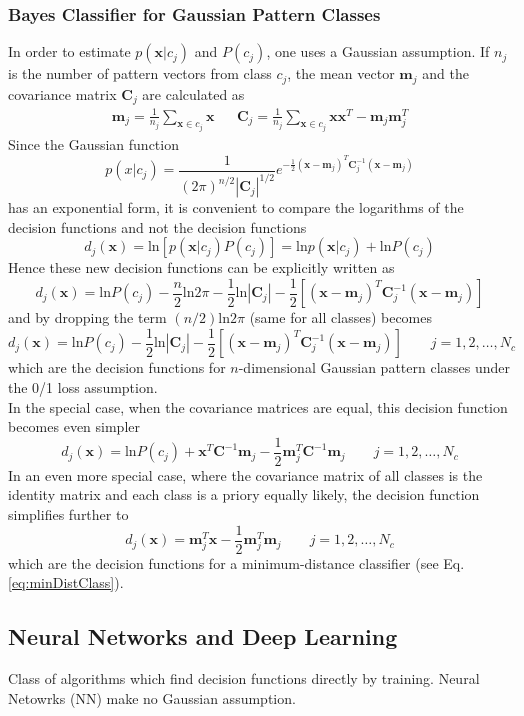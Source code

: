 \subsubsection{Bayes Classifier for Gaussian Pattern Classes}
In order to estimate $p(\mathbf{x}|c_j)$ and $P(c_j)$, one uses a Gaussian assumption.
If $n_j$ is the number of pattern vectors from class $c_j$, the mean vector $\mathbf{m}_j$ and the covariance matrix $\mathbf{C}_j$ are calculated as
\begin{align*}
	\mathbf{m}_j = \frac{1}{n_j} \sum\limits_{\mathbf{x}\in c_j} \mathbf{x}
	&&
	\mathbf{C}_j = \frac{1}{n_j} \sum\limits_{\mathbf{x}\in c_j} \mathbf{x}\mathbf{x}^T - \mathbf{m}_j\mathbf{m}_j^T
\end{align*}
Since the Gaussian function
\[
  p(x|c_j) = \frac{1}{(2\pi)^{n/2} |\mathbf{C}_j|^{1/2}} e^{-\frac{1}{2}(\mathbf{x} - \mathbf{m}_j)^T \mathbf{C}_j^{-1} (\mathbf{x} - \mathbf{m}_j)}
\]
has an exponential form, it is convenient to compare the logarithms of the decision functions and not the decision functions
\[
  d_j(\mathbf{x}) = \text{ln}[p(\mathbf{x}|c_j) P(c_j)] = \text{ln}p(\mathbf{x}|c_j) + \text{ln}P(c_j)
\]
Hence these new decision functions can be explicitly written as
\[
  d_j(\mathbf{x}) = \text{ln}P(c_j) - \frac{n}{2}\text{ln}2\pi - \frac{1}{2}\text{ln}|\mathbf{C}_j| - \frac{1}{2}[(\mathbf{x} - \mathbf{m}_j)^T \mathbf{C}_j^{-1} (\mathbf{x} - \mathbf{m}_j)]
\]
and by dropping the term $(n/2)\text{ln}2\pi$ (same for all classes) becomes
\[
  d_j(\mathbf{x}) = \text{ln}P(c_j) - \frac{1}{2}\text{ln}|\mathbf{C}_j| - \frac{1}{2}[(\mathbf{x} - \mathbf{m}_j)^T \mathbf{C}_j^{-1} (\mathbf{x} - \mathbf{m}_j)] \qquad j = 1,2,\ldots,N_c
\]
which are the decision functions for $n$-dimensional Gaussian pattern classes under the 0/1 loss assumption.\\
In the special case, when the covariance matrices are equal, this decision function becomes even simpler
\[
  d_j(\mathbf{x}) = \text{ln}P(c_j) + \mathbf{x}^T \mathbf{C}^{-1} \mathbf{m}_j - \frac{1}{2}\mathbf{m}_j^T\mathbf{C}^{-1}\mathbf{m}_j \qquad j = 1,2,\ldots,N_c
\]
In an even more special case, where the covariance matrix of all classes is the identity matrix and each class is a priory equally likely, the decision function simplifies further to
\[
  d_j(\mathbf{x}) = \mathbf{m}_j^T \mathbf{x} - \frac{1}{2}\mathbf{m}_j^{T}\mathbf{m}_j \qquad j = 1,2,\ldots,N_c
\]
which are the decision functions for a minimum-distance classifier (see Eq. \ref{eq:minDistClass}).


\subsection{Neural Networks and Deep Learning}
Class of algorithms which find decision functions directly by training. Neural Netowrks (NN) make no Gaussian assumption.


